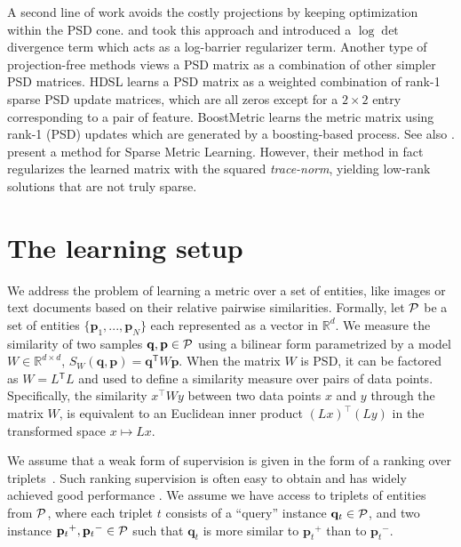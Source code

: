 \documentclass[twoside,11pt]{article}
\newcommand\mat[1]{{#1}}
\renewcommand\vec[1]{\mathbf{#1}}
\newcommand{\T}{{}^\mathsf{T}}
\newcommand{\W}{\mat{W}}
\newcommand{\Rd}{\mathbb{R}^d}
\newcommand{\ignore}[1]{}
\newcommand{\q}{{\vec{q}}}
\newcommand{\p}{{\vec{p}}}
\newcommand{\trip}{{t}}
\newcommand{\qt}{{\q_{\trip}}}
\newcommand{\pt}{{\p_{\trip}}}
\newcommand{\cholL}{\mat{L}}
\begin{document}
A second line of work avoids the costly projections by keeping optimization within the PSD cone. \citet{davis2007information} and \citet{lego} took this approach and introduced a $\log \det$ divergence term which acts as a log-barrier regularizer term. Another type of projection-free methods views a PSD matrix as a combination of other simpler PSD matrices. HDSL \citep{HDSL} learns a PSD matrix as a weighted combination of rank-1 sparse PSD update matrices, which are all zeros except for a $2\times2$ entry corresponding to a pair of feature. BoostMetric \citep{boost} learns the metric matrix using rank-1 (PSD) updates which are generated by a boosting-based process. See also \citet{bi2011adaboost, liu2012robust}. \citet{ying2009sparse} present a method for Sparse Metric Learning. However, their method in fact regularizes the learned matrix with the squared \emph{trace-norm}, yielding low-rank solutions that are not truly sparse.
\ignore{This yields low-rank but not truly sparse metrics. Their method also has a slower convergence rate, and is based on iteratively solving $|T|$-dimensional quadratic problems with linear constraints, where $|T|$ is the number of training triplets, as well as requiring a repeated full eigendecompositions.}

\vskip -5pt
\section{The learning setup}
\vskip -5pt
We address the problem of learning a metric over a set of
entities, like images or text documents based on their
relative pairwise similarities. Formally, let $\cal{P}$ be a set of entities $\{\p_1,...,\p_N\}$ each represented as a vector in $\Rd$. We measure the similarity of two samples $\q, \p \in \cal{P}$ using a bilinear form parametrized by a model $\W \in \mathbb{R}^{d \times d}$, $S_{\W}(\q, \p) = \q\T \W \p$.
When the matrix $\W$ is PSD, it can be factored as $\W = \cholL\T \cholL$ and used to define a similarity measure over pairs of data points. Specifically, the similarity $x^\top\W y$ between two data points $x$ and $y$ through the matrix $\W$, is equivalent to an Euclidean inner product  $(\cholL x)^\top(\cholL y)$ in the transformed space $x \mapsto \cholL x$. 

We assume that a weak form of supervision is given in the form of a ranking over triplets~\citep{weinberger2006dml,OASIS,qian}. Such ranking supervision is often easy to obtain and has widely achieved good performance . We assume we have access to triplets of entities from $\cal{P}$, where each triplet $t$ consists of
a ``query'' instance $\qt \in \cal{P}$, and two instance $\pt^{+}, \pt^{-} \in \cal{P}$ such that $\qt$ is more similar to $\pt^{+}$
than to $\pt^{-}$.
\end{document}
